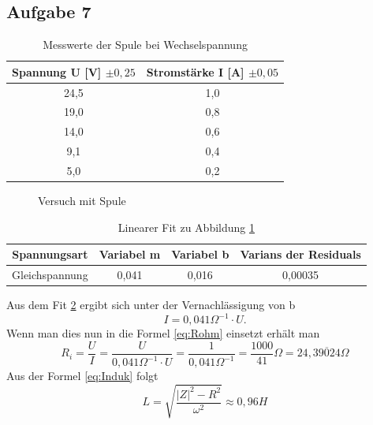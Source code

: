 \subsection{Aufgabe 7}
\begin{table}[H]
  \centering
  \begin{tabular}{c | c }
    Spannung U [V] $\pm0,25$ & Stromstärke I [A] $\pm 0,05$ \\ \hline
    24,5 & 1,0 \\
    19,0 & 0,8\\
	14,0 & 0,6 \\
    9,1 & 0,4 \\
    5,0 & 0,2 \\ 
  \end{tabular}
  \caption{Messwerte der Spule bei Wechselspannung}
  \label{tab:messungspulegleich}
\end{table}
\begin{figure}[H]
  \centering
  \caption{Versuch mit Spule}
  \label{fig:UIGleichSpule}
\end{figure}
\begin{table}[H]
  \centering
  \begin{tabular}{c | c | c | c}
    Spannungsart & Variabel m & Variabel b & Varians der Residuals\\ \hline
    Gleichspannung & 0,041 & 0,016 & 0,00035
  \end{tabular}
  \caption{Linearer Fit zu Abbildung \ref{fig:UIGleichSpule}}
  \label{tab:fitUIGleichSpule}
\end{table}
Aus dem Fit \ref{tab:fitUIGleichSpule} ergibt sich unter der Vernachlässigung von b
\begin{equation}
I=0,041\Omega^{-1}\cdot U.
\end{equation}
Wenn man dies nun in die Formel \ref{eq:Rohm} einsetzt erhält man
\begin{equation}
R_i=\frac{U}{I}=\frac{U}{0,041\Omega^{-1}\cdot U}=\frac{1}{0,041\Omega^{-1}}= \frac{1000}{41}\Omega = 24,\overline{39024} \Omega
\end{equation}
Aus der Formel \ref{eq:Induk} folgt
\begin{equation}
L=\sqrt{\frac{|Z|^2-R^2}{\omega^2}}\approx 0,96 H
\end{equation}
